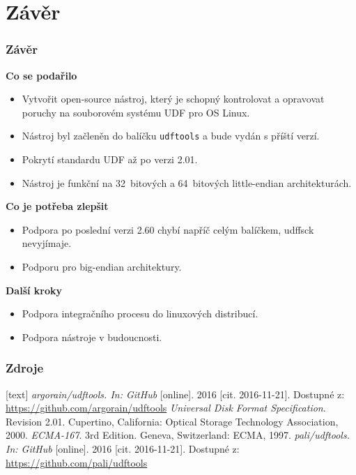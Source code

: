 \documentclass[aspectratio=169]{beamer}
\begin{document}
    \section{Závěr}
		\begin{frame}
			\frametitle{Závěr}
			\vspace{40 pt}
			\Large\textbf{Co se podařilo}
			\begin{itemize}
				\item\large Vytvořit open-source nástroj, který je schopný kontrolovat a opravovat poruchy na souborovém systému UDF pro OS Linux.
                \item\large Nástroj byl začleněn do balíčku \texttt{udftools} a bude vydán s příští verzí.
				\item\large Pokrytí standardu UDF až po verzi 2.01.
				\item\large Nástroj je funkční na 32~bitových a 64~bitových little-endian architekturách.
			\end{itemize}
			\Large\textbf{Co je potřeba zlepšit}
			\begin{itemize}
				\item\large Podpora po poslední verzi 2.60 chybí napříč celým balíčkem, udffsck nevyjímaje.
				\item\large Podporu pro big-endian architektury.
			\end{itemize}
			\Large\textbf{Další kroky}
			\begin{itemize}
				\item\large Podpora integračního procesu do linuxových distribucí.
                \item\large Podpora nástroje v budoucnosti.
			\end{itemize}
		\end{frame}
	    
        \begin{frame}
			\frametitle{Zdroje}
			\vspace{40 pt}
            \begin{thebibliography}{9}
                    [text]
                 \emph{argorain/udftools. In: GitHub}\/ [online]. 2016 [cit. 2016-11-21]. Dostupné z: \url{https://github.com/argorain/udftools}
                 \emph{Universal Disk Format Specification}. Revision 2.01. Cupertino, California: Optical Storage Technology Association, 2000.
                 \emph{ECMA-167}. 3rd Edition. Geneva, Switzerland: ECMA, 1997.
                 \emph{pali/udftools. In: GitHub}\/ [online]. 2016 [cit. 2016-11-21]. Dostupné z: \url{https://github.com/pali/udftools}
            \end{thebibliography}
		\end{frame}
\end{document}
